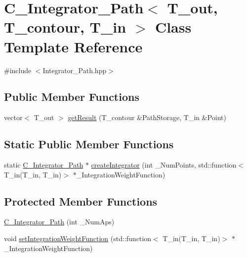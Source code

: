 \hypertarget{class_c___integrator___path}{\section{C\-\_\-\-Integrator\-\_\-\-Path$<$ T\-\_\-out, T\-\_\-contour, T\-\_\-in $>$ Class Template Reference}
\label{class_c___integrator___path}
}


{\ttfamily \#include $<$Integrator\-\_\-\-Path.\-hpp$>$}

\subsection*{Public Member Functions}
\begin{DoxyCompactItemize}
\item 
vector$<$ T\-\_\-out $>$ \hyperlink{class_c___integrator___path_a95026f1b45d90861f246b828ce9131c0}{get\-Result} (T\-\_\-contour \&Path\-Storage, T\-\_\-in \&Point)
\end{DoxyCompactItemize}
\subsection*{Static Public Member Functions}
\begin{DoxyCompactItemize}
\item 
static \hyperlink{class_c___integrator___path}{C\-\_\-\-Integrator\-\_\-\-Path} $\ast$ \hyperlink{class_c___integrator___path_ad68512fccb5e8ef0402b214401268a2a}{create\-Integrator} (int \-\_\-\-Num\-Points, std\-::function$<$ T\-\_\-in(T\-\_\-in, T\-\_\-in)$>$ $\ast$\-\_\-\-Integration\-Weight\-Function)
\end{DoxyCompactItemize}
\subsection*{Protected Member Functions}
\begin{DoxyCompactItemize}
\item 
\hyperlink{class_c___integrator___path_ab4acfaa64baff2436a466a3e2f099827}{C\-\_\-\-Integrator\-\_\-\-Path} (int \-\_\-\-Num\-Aps)
\item 
void \hyperlink{class_c___integrator___path_ab02353508a8140cafd2d2cf1ad8368ac}{set\-Integration\-Weight\-Function} (std\-::function$<$ T\-\_\-in(T\-\_\-in, T\-\_\-in)$>$ $\ast$\-\_\-\-Integration\-Weight\-Function)
\end{DoxyCompactItemize}
